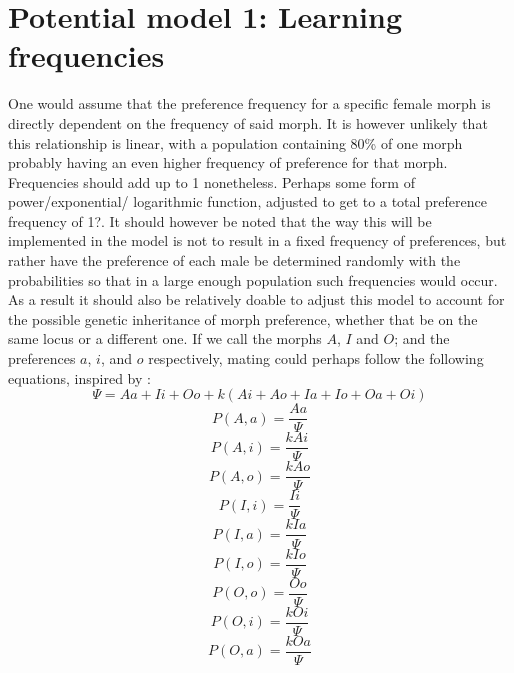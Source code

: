 \documentclass{article}
\begin{document}
\section{Potential model 1: Learning frequencies}
One would assume that the preference frequency for a specific female morph is directly dependent on the frequency of said morph. It is however unlikely that this relationship is linear, with a population containing 80\% of one morph probably having an even higher frequency of preference for that morph. Frequencies should add up to 1 nonetheless. Perhaps some form of power/exponential/ logarithmic function, adjusted to get to a total preference frequency of 1?. It should however be noted that the way this will be implemented in the model is not to result in a fixed frequency of preferences, but rather have the preference of each male be determined randomly with the probabilities so that in a large enough population such frequencies would occur. As a result it should also be relatively doable to adjust this model to account for the possible genetic inheritance of morph preference, whether that be on the same locus or a different one.
If we call the morphs \(A\), \(I\) and \(O\); and the preferences \(a\), \(i\), and \(o\) respectively, mating could perhaps follow the following equations, inspired by \cite{Hardling2006}:
\begin{equation}\Psi = Aa + Ii + Oo + k(Ai + Ao + Ia + Io + Oa + Oi) \end{equation}
\begin{equation}P(A,a) = \frac{Aa}{\Psi} \end{equation}
\begin{equation}P(A,i) = \frac{kAi}{\Psi} \end{equation}
\begin{equation}P(A,o) = \frac{kAo}{\Psi} \end{equation}
\begin{equation}P(I,i) = \frac{Ii}{\Psi} \end{equation}
\begin{equation}P(I,a) = \frac{kIa}{\Psi} \end{equation}
\begin{equation}P(I,o) = \frac{kIo}{\Psi} \end{equation}
\begin{equation}P(O,o) = \frac{Oo}{\Psi} \end{equation}
\begin{equation}P(O,i) = \frac{kOi}{\Psi} \end{equation}
\begin{equation}P(O,a) = \frac{kOa}{\Psi} \end{equation}
\end{document}
